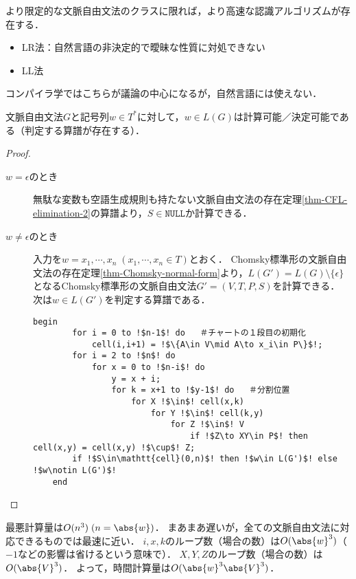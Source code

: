 \begin{remark}
    より限定的な文脈自由文法のクラスに限れば，より高速な認識アルゴリズムが存在する．
    \begin{itemize}
        \item LR法：自然言語の非決定的で曖昧な性質に対処できない
        \item LL法
    \end{itemize}
    コンパイラ学ではこちらが議論の中心になるが，自然言語には使えない．
\end{remark}

\begin{theorem}
    文脈自由文法$G$と記号列$w\in T^*$に対して，$w\in L(G)$は計算可能／決定可能である（判定する算譜が存在する）．
\end{theorem}
\begin{proof}\mbox{}
    \begin{description}
        \item[$w=\epsilon$のとき] 
        無駄な変数も空語生成規則も持たない文脈自由文法の存在定理\ref{thm-CFL-elimination-2}の算譜より，$S\in\mathtt{NULL}$か計算できる．
        \item[$w\ne\epsilon$のとき] 入力を$w=x_1,\cdots,x_n\;(x_1,\cdots,x_n\in T)$とおく．
        Chomsky標準形の文脈自由文法の存在定理\ref{thm-Chomsky-normal-form}より，$L(G')=L(G)\setminus\{\epsilon\}$となるChomsky標準形の文脈自由文法$G'=(V,T,P,S)$を計算できる．
        次は$w\in L(G')$を判定する算譜である．
\begin{lstlisting}[escapechar=!]
    begin
        for i = 0 to !$n-1$! do   ＃チャートの１段目の初期化
            cell(i,i+1) = !$\{A\in V\mid A\to x_i\in P\}$!;
        for i = 2 to !$n$! do
            for x = 0 to !$n-i$! do
                y = x + i;
                for k = x+1 to !$y-1$! do   ＃分割位置
                    for X !$\in$! cell(x,k)
                        for Y !$\in$! cell(k,y)
                            for Z !$\in$! V
                                if !$Z\to XY\in P$! then cell(x,y) = cell(x,y) !$\cup$! Z;
        if !$S\in\mathtt{cell}(0,n)$! then !$w\in L(G')$! else !$w\notin L(G')$!
    end
\end{lstlisting}
    \end{description}
\end{proof}
\begin{remarks}
    最悪計算量は$O(n^3)\;(n=\abs{w})$．
    まあまあ遅いが，全ての文脈自由文法に対応できるものでは最速に近い．
    $i,x,k$のループ数（場合の数）は$O(\abs{w}^3)$（$-1$などの影響は省けるという意味で）．
    $X,Y,Z$のループ数（場合の数）は$O(\abs{V}^3)$．
    よって，時間計算量は$O(\abs{w}^3\abs{V}^3)$．
\end{remarks}

